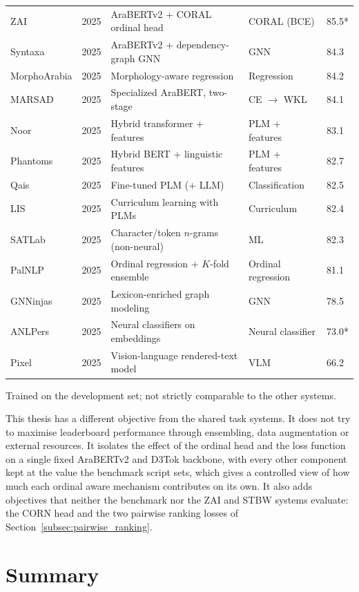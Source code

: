\begin{table}[H]
\begin{tabular}{p{2.4cm} p{0.8cm} p{4.8cm} p{2.2cm} p{1.2cm}}
ZAI & 2025 & AraBERTv2 + CORAL ordinal head & CORAL (BCE) & 85.5* \\
Syntaxa & 2025 & AraBERTv2 + dependency-graph GNN & GNN & 84.3 \\
MorphoArabia & 2025 & Morphology-aware regression & Regression & 84.2 \\
MARSAD & 2025 & Specialized AraBERT, two-stage & CE $\rightarrow$ WKL & 84.1 \\
Noor & 2025 & Hybrid transformer + features & PLM + features & 83.1 \\
Phantoms & 2025 & Hybrid BERT + linguistic features & PLM + features & 82.7 \\
Qais & 2025 & Fine-tuned PLM (+ LLM) & Classification & 82.5 \\
LIS & 2025 & Curriculum learning with PLMs & Curriculum & 82.4 \\
SATLab & 2025 & Character/token $n$-grams (non-neural) & ML & 82.3 \\
PalNLP & 2025 & Ordinal regression + $K$-fold ensemble & Ordinal regression & 81.1 \\
GNNinjas & 2025 & Lexicon-enriched graph modeling & GNN & 78.5 \\
ANLPers & 2025 & Neural classifiers on embeddings & Neural classifier & 73.0* \\
Pixel & 2025 & Vision-language rendered-text model & VLM & 66.2 \\
\bottomrule
\end{tabular}

\vspace{0.15cm}
{\footnotesize * Trained on the development set; not strictly comparable to the other systems.}
\end{table}

This thesis has a different objective from the shared task systems. It does not try to maximise leaderboard performance through ensembling, data augmentation or external resources. It isolates the effect of the ordinal head and the loss function on a single fixed AraBERTv2 and D3Tok backbone, with every other component kept at the value the benchmark script sets, which gives a controlled view of how much each ordinal aware mechanism contributes on its own. It also adds objectives that neither the benchmark nor the ZAI and STBW systems evaluate: the CORN head and the two pairwise ranking losses of Section~\ref{subsec:pairwise_ranking}.
\section{Summary}

